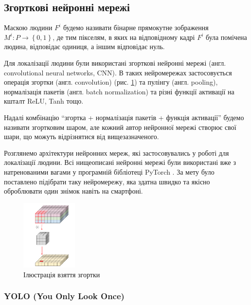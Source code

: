 \subsection{Згорткові нейронні мережі}

\begin{definition}
    Маскою людини \(F^{i}\) будемо називати бінарне прямокутне
    зображення \(M^{i}:P \rightarrow \left\{ 0,1 \right\}\), де тим
    пікселям, в яких на відповідному кадрі \(F^{i}\) була помічена людина,
    відповідає одиниця, а іншим відповідає нуль.
\end{definition}
Для локалізації людини були використані згорткові нейронні мережі
(англ. convolutional neural networks, CNN).
В таких нейромережах застосовується операція згортки (англ. convolution) 
(рис. \ref{fig:cnn:conv_operation})
та пулінгу (англ. pooling), нормалізація пакетів (англ. batch normalization)
та різні функції активації на кшталт ReLU, Tanh тощо.

Надалі комбінацію ``згортка + нормалізація пакетів + функція активації''
будемо називати згортковим шаром, але кожний автор нейронної мережі
створює свої шари, що можуть відрізнятися від вищезазначеного.

Розглянемо архітектури нейронних мереж, які застосовувались у роботі
для локалізації людини. Всі нищеописані нейронні мережі були використані вже з
натренованими вагами у програмній бібліотеці PyTorch \cite{bib:pytorch_library}.
За мету було поставлено підібрати таку нейромережу, яка здатна швидко та якісно оброблювати
один знімок навіть на смартфоні.

\begin{figure}[H]
    \centering
    \includegraphics[width=0.25\textwidth]{images/cnn_conv_operation}
    \caption{Ілюстрація взяття згортки  \cite{website:deep_wise_sep_conv}
        \label{fig:cnn:conv_operation}
    }
\end{figure}

\subsubsection{YOLO (You Only Look Once)}


